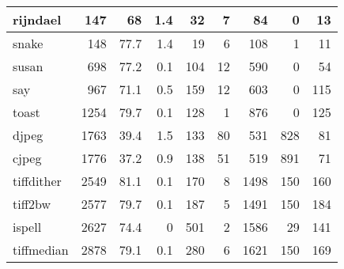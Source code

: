 \begin{tabular}{|l|r|r|r|r|r|r|r|r|}
\hline
 rijndael        &      147 &     68   &    1.4 &   32 &    7 &     84 &     0 &    13 \\
\hline
 snake           &      148 &     77.7 &    1.4 &   19 &    6 &    108 &     1 &    11 \\
\hline
 susan           &      698 &     77.2 &    0.1 &  104 &   12 &    590 &     0 &    54 \\
\hline
 say             &      967 &     71.1 &    0.5 &  159 &   12 &    603 &     0 &   115 \\
\hline
 toast           &     1254 &     79.7 &    0.1 &  128 &    1 &    876 &     0 &   125 \\
\hline
 djpeg           &     1763 &     39.4 &    1.5 &  133 &   80 &    531 &   828 &    81 \\
\hline
 cjpeg           &     1776 &     37.2 &    0.9 &  138 &   51 &    519 &   891 &    71 \\
\hline
 tiffdither      &     2549 &     81.1 &    0.1 &  170 &    8 &   1498 &   150 &   160 \\
\hline
 tiff2bw         &     2577 &     79.7 &    0.1 &  187 &    5 &   1491 &   150 &   184 \\
\hline
 ispell          &     2627 &     74.4 &    0   &  501 &    2 &   1586 &    29 &   141 \\
\hline
 tiffmedian      &     2878 &     79.1 &    0.1 &  280 &    6 &   1621 &   150 &   169 \\
\hline
\end{tabular}

